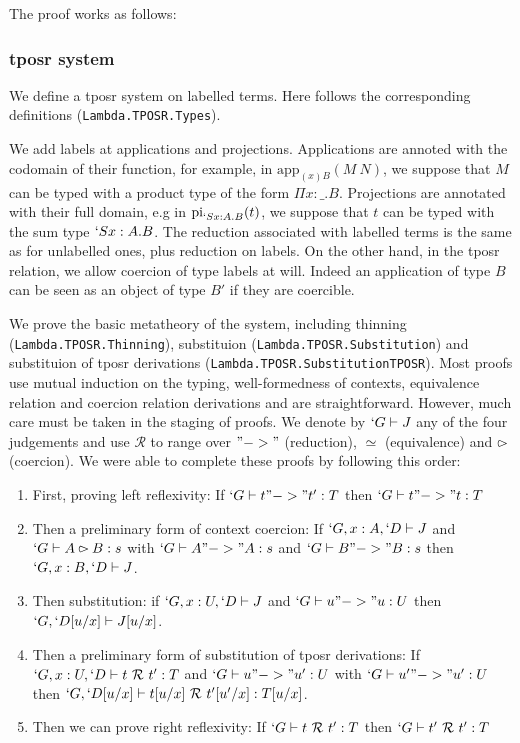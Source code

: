 \documentclass[11pt]{article}
\def\TPOSR{{\sc tposr}\xspace}
\def\coqmodule#1{\texttt{#1}}
\begin{document}
\def\lapp#1#2{\text{app}_{#1}(#2)}
\def\lpi#1#2{\text{pi}_{#1}(#2)}
\def\rel{\mathcal{R}}



The proof works as follows: 

\subsubsection*{\TPOSR system}
We define a \TPOSR system on labelled terms. Here follows the
corresponding \Coq definitions (\coqmodule{Lambda.TPOSR.Types}).

\vspace{1em}



We add labels at applications and projections. 
Applications are annoted with the codomain of their function, for example, in
$\lapp{(x)B}{M~N}$, we suppose that $M$ can be typed with a product
type of the form $\Pi x : \_. B$. Projections are annotated with their
full domain, e.g in $\lpi{`S x : A.B}{t}$, we suppose that $t$ can be
typed with the sum type $`S x : A.B$. The reduction associated with
labelled terms is the same as for unlabelled ones, plus reduction on
labels. On the other hand, in the \TPOSR relation, we allow coercion
of type labels at will. Indeed an application of type $B$ can be seen
as an object of type $B'$ if they are coercible. 

We prove the basic metatheory of the system, including thinning
 (\coqmodule{Lambda.TPOSR.Thinning}), substituion
(\coqmodule{Lambda.TPOSR.Substitution}) and
substituion of \TPOSR derivations
(\coqmodule{Lambda.TPOSR.SubstitutionTPOSR}). Most proofs use mutual
induction on the typing, well-formedness of contexts, equivalence
relation and coercion relation derivations and are
straightforward. 
However, much care must be taken in the staging of
proofs. We denote by $`G \vdash J$ any of the four judgements and use
$\rel$ to range over $"->"$ (reduction), $\simeq$ (equivalence) and $\rightslice$ (coercion).
We were able to complete these proofs by following this order:
\begin{enumerate}
\item First, proving left reflexivity:
  If $`G \vdash t "->" t' : T$ then $`G \vdash t "->" t : T$
\item Then a preliminary form of context coercion:
  If $`G, x : A, `D \vdash J$ and $`G \vdash A \rightslice B : s$ 
  with $`G \vdash A "->" A : s$ and $`G \vdash B "->" B : s$ then
  $`G, x : B, `D \vdash J$.
\item Then substitution: if $`G, x : U, `D \vdash J$ and $`G \vdash u
  "->" u : U$ then $`G, `D[u/x] \vdash J[u/x]$.
\item Then a preliminary form of substitution of \TPOSR derivations:
  If $`G, x : U, `D \type t~\rel~t' : T$ and $`G \vdash u "->" u' : U$
  with $`G \vdash u' "->" u' : U$ 
  then $`G, `D[u/x] \type t[u/x]~\rel~t'[u'/x] : T[u/x]$.
\item Then we can prove right reflexivity:
  If $`G \type t~\rel~t' : T$ then $`G \type t'~\rel~t' : T$
\end{enumerate}
   
\end{document}

